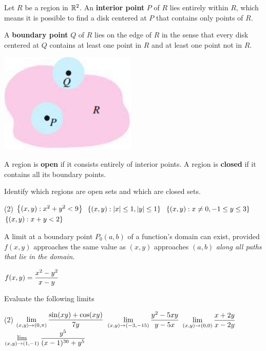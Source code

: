 \documentclass[mathNotesPreamble]{subfiles}
\begin{document}
  \begin{defn*}
    Let $R$ be a region in $\mathbb{R}^2$. An \textbf{interior point} $P$ of $R$ lies entirely within $R$, which means it is possible to find a disk centered at $P$ that contains only points of $R$.
    \vspace*{\baselineskip}
    
    A \textbf{boundary point} $Q$ of $R$ lies on the edge of $R$ in the sense that every disk centered at $Q$ contains at least one point in $R$ and at least one point not in $R$.
  \end{defn*}
  \begin{center}
    \includegraphics[width=0.25\linewidth]{images/briggs_15_02/fig15_22}
  \end{center}

  \begin{defn*}
    A region is \textbf{open} if it consists entirely of interior points. A region is \textbf{closed} if it contains all its boundary points.
  \end{defn*}
  \begin{ex*}
    Identify which regions are open sets and which are closed sets.
  \end{ex*}
  \begin{tasks}[after-item-skip=\stretch{1}, label=](2)
    \task ${\left\{(x,y): x^2+y^2 < 9\right\}}$
    \task ${\left\{(x,y): {\left\vert x\right\vert}\leq 1, {\left\vert y\right\vert}\leq 1\right\}}$
    \task ${\left\{(x,y): x\neq 0, -1\leq y\leq 3\right\}}$
    \task ${\left\{(x,y): x+y<2\right\}}$
  \end{tasks}
  \pagebreak

  A limit at a boundary point $P_0(a,b)$ of a function's domain can exist, provided $f(x,y)$ approaches the same value as $(x,y)$ approaches $(a,b)$ \textit{along all paths that lie in the domain}.
  \begin{ex*}
    $\displaystyle f(x,y)=\frac{x^2-y^2}{x-y}$
  \end{ex*}

  \begin{ex*}
    Evaluate the following limits
  \end{ex*}
  \begin{tasks}[after-item-skip=\stretch{1}, label=](2)
    \task $\displaystyle\lim_{(x,y)\to (0,\pi)} \frac{\sin(xy)+\cos(xy)}{7y}$
    \task $\displaystyle\lim_{(x,y)\to (-3,-15)} \frac{y^2-5xy}{y-5x}$
    \task $\displaystyle\lim_{(x,y)\to (0,0)} \frac{x+2y}{x-2y}$
    \task $\displaystyle\lim_{(x,y)\to (1,-1)} \frac{y^5}{(x-1)^{30}+y^5}$
  \end{tasks}
\end{document}
